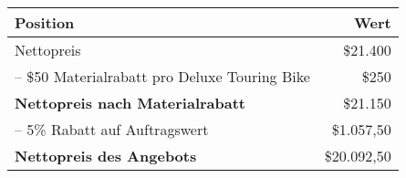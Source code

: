 
\setlength{\extrarowheight}{2pt}
\setlength{\tabcolsep}{0.3em}
\begin{tabular}{|lr|}
\rowcolor{heading}\color{white}\textbf{Position} &
\color{white}\textbf{Wert}\\
\hline
Nettopreis &
\$21.400\\
 -- \$50 Materialrabatt pro Deluxe Touring Bike &
\$250\\
\textbf{Nettopreis nach Materialrabatt}&\$21.150\\
 -- 5\% Rabatt auf Auftragswert &
\$1.057,50\\
\textbf{Nettopreis des Angebots}&
\$20.092,50\\
\hline
\end{tabular}